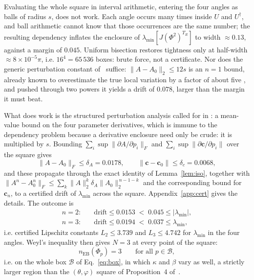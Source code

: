 \documentclass[11pt,a4paper]{article}
\theoremstyle{definition}
\theoremstyle{remark}
\newcommand{\nEB}{n_{\mathrm{EB}}}
\begin{document}
Evaluating the whole square in interval arithmetic, entering the four angles
as balls of radius $s$, does not work. Each angle occurs many times inside $U$
and $U^{\dagger}$, and ball arithmetic cannot know that those occurrences are
the same number; the resulting dependency inflates the enclosure of
$\lambda_{\min}[J(\Phi^{2})^{T_{R}}]$ to width $\approx0.13$, against a margin
of $0.045$. Uniform bisection restores tightness only at half-width
$\approx8\times10^{-5}\pi$, i.e. $16^{4}=65\,536$ boxes: brute force, not a
certificate. Nor does the generic perturbation constant
of~\cite{PaperI} suffice: $\|A-A_{0}\|_{2}\le12s$ is an $n=1$ bound, already
known to overestimate the true local variation by a factor of about five
\cite[Rem.~2]{PaperI}, and pushed through two powers it yields a drift of
$0.078$, larger than the margin it must beat.

What does work is the structured perturbation analysis called for in
\cite[Sec.~X]{PaperI}: a mean-value bound on the four parameter derivatives,
which is immune to the dependency problem because a derivative enclosure need
only be
crude: it is multiplied by $s$. Bounding
$\sum_{i}\sup\|\partial A/\partial p_{i}\|_{F}$ and
$\sum_{i}\sup\|\partial\bm{c}/\partial p_{i}\|$ over the square gives
\begin{equation}\label{eq:deltas}
  \|A-A_{0}\|_{F}\le\delta_{A}=0.0178,\qquad
  \|\bm{c}-\bm{c}_{0}\|\le\delta_{c}=0.0068 ,
\end{equation}
and these propagate through the exact identity of Lemma~\ref{lem:iso},
together with $\|A^{n}-A_{0}^{n}\|_{F}\le\sum_{k}\|A\|_{2}^{k}\delta_{A}
\|A_{0}\|_{2}^{\,n-1-k}$ and the corresponding bound for $\bm{c}_{n}$, to a
certified drift of $\lambda_{\min}$ across the square. Appendix~\ref{app:cert}
gives the details. The outcome is
\begin{equation}\label{eq:drifts}
  \begin{aligned}
    n=2:&\quad \text{drift}\le0.0153 \;<\; 0.045\le|\lambda_{\min}| ,\\
    n=3:&\quad \text{drift}\le0.0194 \;<\; 0.037\le \lambda_{\min} ,
  \end{aligned}
\end{equation}
i.e. certified Lipschitz constants $L_{2}\le3.739$ and $L_{3}\le4.742$ for
$\lambda_{\min}$ in the four angles. Weyl's inequality then gives $N=3$ at
every point of the square:
\begin{equation}
  \nEB(\Phi_{p})=3\qquad\text{for all } p\in\mathcal{B},
\end{equation}
i.e. on the whole box $\mathcal{B}$ of Eq.~\eqref{eq:box}, in which $\kappa$ and
$\beta$ vary as well, a strictly larger region than the $(\theta,\varphi)$
square of Proposition~4 of~\cite{PaperI}.
\end{document}
